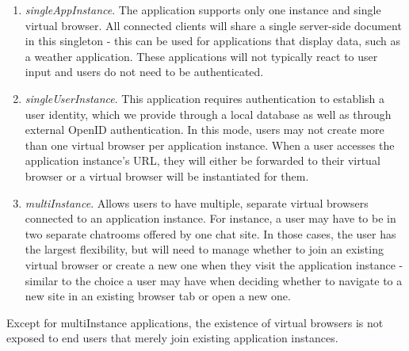 \begin{enumerate}
\item \emph{singleAppInstance}. The application supports only one instance and single virtual browser.
    All connected clients will share a single server-side document in this singleton - this can be
    used for applications that display data, such as a weather application. These applications will not
    typically react to user input and users do not need to be authenticated.

\item \emph{singleUserInstance}.  This application requires authentication to establish a
    user identity, which we provide through a local database as well as through external OpenID
    authentication.   In this mode, users may not create more than one virtual browser per
    application instance.  When a user accesses the application instance's URL, they will either
    be forwarded to their virtual browser or a virtual browser will be instantiated for them.

\item \emph{multiInstance}.
    Allows users to have multiple, separate virtual browsers connected to an application
    instance. For instance, a user may have to be in two separate chatrooms offered by one chat site.
    In those cases, the user has the largest flexibility, but will need to manage whether
    to join an existing virtual browser or create a new one when they visit the application instance
    - similar to the choice a user may have when deciding whether to navigate to a new site in
    an existing browser tab or open a new one.
\end{enumerate}
Except for multiInstance applications, the existence of virtual browsers is not exposed to
end users that merely join existing application instances.




